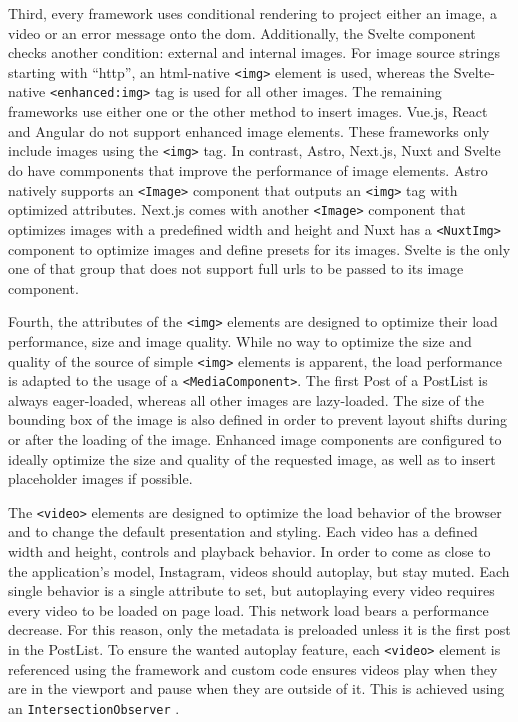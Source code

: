 \documentclass[a4paper, 10pt]{article}
\begin{document}
Third, every framework uses conditional rendering to project either an image, a video or an error message onto the \acrshort{dom}.
Additionally, the Svelte component checks another condition: external and internal images.
For image source strings starting with \enquote{http}, an \acrshort{html}-native \verb|<img>| element is used, whereas the Svelte-native \verb|<enhanced:img>| tag is used for all other images.
The remaining frameworks use either one or the other method to insert images.
Vue.js, React and Angular do not support enhanced image elements.
These frameworks only include images using the \verb|<img>| tag.
In contrast, Astro, Next.js, Nuxt and Svelte do have commponents that improve the performance of image elements.
Astro natively supports an \verb|<Image>| component that outputs an \verb|<img>| tag with optimized attributes.
Next.js comes with another \verb|<Image>| component that optimizes images with a predefined width and height and Nuxt has a \verb|<NuxtImg>| component to optimize images and define presets for its images.
Svelte is the only one of that group that does not support full \acrshort{url}s to be passed to its image component.

Fourth, the attributes of the \verb|<img>| elements are designed to optimize their load performance, size and image quality.
While no way to optimize the size and quality of the source of simple \verb|<img>| elements is apparent, the load performance is adapted to the usage of a \verb|<MediaComponent>|.
The first Post of a PostList is always eager-loaded, whereas all other images are lazy-loaded.
The size of the bounding box of the image is also defined in order to prevent layout shifts during or after the loading of the image.
Enhanced image components are configured to ideally optimize the size and quality of the requested image, as well as to insert placeholder images if possible.

The \verb|<video>| elements are designed to optimize the load behavior of the browser and to change the default presentation and styling.
Each video has a defined width and height, controls and playback behavior.
In order to come as close to the application's model, Instagram, videos should autoplay, but stay muted.
Each single behavior is a single attribute to set, but autoplaying every video requires every video to be loaded on page load.
This network load bears a performance decrease.
For this reason, only the metadata is preloaded unless it is the first post in the PostList.
To ensure the wanted autoplay feature, each \verb|<video>| element is referenced using the framework and custom code ensures videos play when they are in the viewport and pause when they are outside of it.
This is achieved using an \verb|IntersectionObserver| \citep{IntersectionObserver}.
\end{document}

